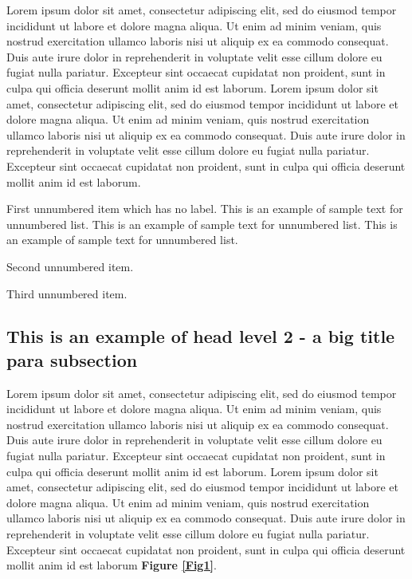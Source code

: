 \documentclass{sbc2025}%
\begin{document}
Lorem ipsum dolor sit amet, consectetur adipiscing elit, sed do eiusmod tempor incididunt ut labore et dolore magna aliqua. Ut enim ad minim veniam, quis nostrud exercitation ullamco laboris nisi ut aliquip ex ea commodo consequat. Duis aute irure dolor in reprehenderit in voluptate velit esse cillum dolore eu fugiat nulla pariatur. Excepteur sint occaecat cupidatat non proident, sunt in culpa qui officia deserunt mollit anim id est laborum. Lorem ipsum dolor sit amet, consectetur adipiscing elit, sed do eiusmod tempor incididunt ut labore et dolore magna aliqua. Ut enim ad minim veniam, quis nostrud exercitation ullamco laboris nisi ut aliquip ex ea commodo consequat. Duis aute irure dolor in reprehenderit in voluptate velit esse cillum dolore eu fugiat nulla pariatur. Excepteur sint occaecat cupidatat non proident, sunt in culpa qui officia deserunt mollit anim id est laborum.

\begin{unnumlist}
  \item First unnumbered item which has no label. This is an example
  of sample text for unnumbered list. This is an example
  of sample text for unnumbered list. This is an example
  of sample text for unnumbered list.
  \item Second unnumbered item.
  \item Third unnumbered item.
\end{unnumlist}

\subsection{This is an example of head level 2 - a big title para subsection}

Lorem ipsum dolor sit amet, consectetur adipiscing elit, sed do eiusmod tempor incididunt ut labore et dolore magna aliqua. 
Ut enim ad minim veniam, quis nostrud exercitation ullamco laboris nisi ut aliquip ex ea commodo consequat. Duis aute irure dolor in reprehenderit in voluptate velit esse cillum dolore eu fugiat nulla pariatur. Excepteur sint occaecat cupidatat non proident, sunt in culpa qui officia deserunt mollit anim id est laborum. Lorem ipsum dolor sit amet, consectetur adipiscing elit, sed do eiusmod tempor incididunt ut labore et dolore magna aliqua. Ut enim ad minim veniam, quis nostrud exercitation ullamco laboris nisi ut aliquip ex ea commodo consequat. Duis aute irure dolor in reprehenderit in voluptate velit esse cillum dolore eu fugiat nulla pariatur. Excepteur sint occaecat cupidatat non proident, sunt in culpa qui officia deserunt mollit anim id est laborum \textbf{Figure \ref{Fig1}}.
\end{document}
